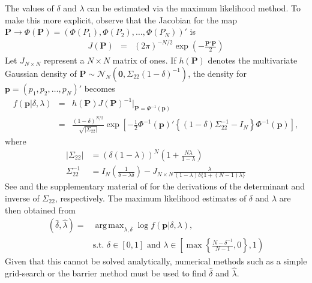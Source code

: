 \documentclass[11pt]{article}
\DeclareMathOperator*{\argmax}{arg\,max}
\theoremstyle{definition}
\theoremstyle{definition}
\begin{document}
The values of $\delta$ and $\lambda$ can be estimated via the maximum likelihood method. To make this more explicit, observe that the Jacobian for the map $\boldsymbol{P} \to \Phi\left(\boldsymbol{P}\right) = (\Phi(P_1), \Phi(P_2), \dots, \Phi(P_N))'$ is
\begin{eqnarray*}
J(\boldsymbol{P}) &=& (2\pi)^{-N/2} \exp \left( - \frac{\boldsymbol{P}' \boldsymbol{P}}{2}   \right) 
\end{eqnarray*}
%
Let $J_{N \times N}$ represent a $N\times N$ matrix of ones. If $h(\boldsymbol{P})$ denotes the multivariate Gaussian density of $\boldsymbol{P} \sim \mathcal{N}_N\left(\boldsymbol{0}, \Sigma_{22} (1-\delta)^{-1}\right)$,
the density for  $\boldsymbol{p} = (p_1, p_2, \dots, p_N)'$ becomes
\begin{eqnarray*}
 f\left(\boldsymbol{p} | \delta, \lambda \right) &=& h(\boldsymbol{P}) J(\boldsymbol{P})^{-1} \bigg|_{\boldsymbol{P} = \Phi^{-1}(\boldsymbol{p})}\\
&=& \frac{(1-\delta)^{N/2}}{\sqrt{ \left|\Sigma_{22}\right|}} \exp\left[ -\frac{1}{2} \Phi^{-1}(\boldsymbol{p})' \left\{ (1-\delta) \Sigma_{22}^{-1} - I_N \right\} \Phi^{-1}(\boldsymbol{p})  \right],
\end{eqnarray*}
where
\begin{align}
\left| \Sigma_{22}\right| &= (\delta(1- \lambda))^N \left(1+\frac{N \lambda}{1 - \lambda} \right) \nonumber\\
\Sigma_{22}^{-1} &= I_N \left(\frac{1}{\delta-\lambda\delta} \right) - J_{N \times N} \frac{\lambda}{(1-\lambda)\delta\{1+(N-1) \lambda\}} \label{inverse}
\end{align}
See \citet{rao2009linear} and the supplementary material of \citet{dobbin2005sample} for the derivations of the determinant and inverse of $\Sigma_{22}$, respectively. The maximum likelihood estimates of $\delta$ and $\lambda$ are then obtained from
\begin{align*}
\left(\hat{\delta}, \hat{\lambda}\right) =& \argmax_{\lambda, \delta} \log  f\left(\boldsymbol{p}| \delta, \lambda \right),\\
& \text{s.t. } \nonumber \delta \in [0,1] \text{ and } \lambda \in \left[  \max \left\{ \frac{N-\delta^{-1}}{N-1}, 0\right\}, 1 \right)
\end{align*}
Given that this cannot be solved analytically, numerical methods such as a simple grid-search or the barrier method must be used to find $\hat{\delta}$ and $\hat{\lambda}$. 
\end{document}
